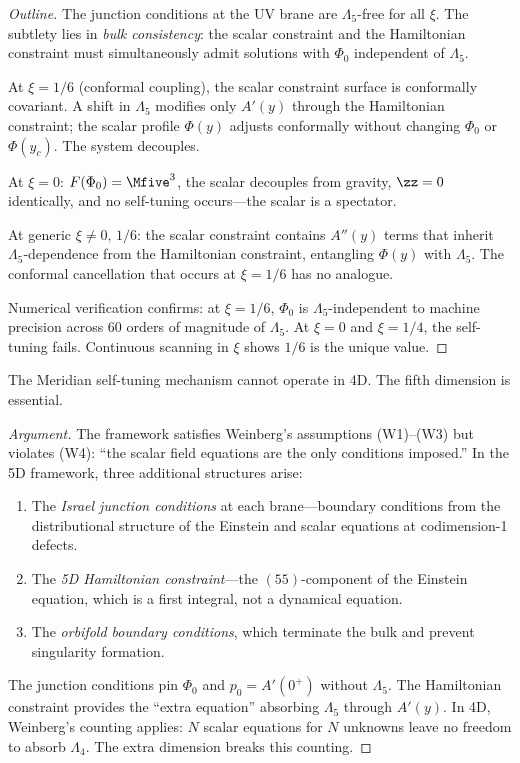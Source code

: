 \begin{proof}[Outline]
The junction conditions at the UV brane are $\Lambda_5$-free for all $\xi$. The subtlety lies in \emph{bulk consistency}: the scalar constraint and the Hamiltonian constraint must simultaneously admit solutions with $\Phi_0$ independent of $\Lambda_5$.

At $\xi = 1/6$ (conformal coupling), the scalar constraint surface is conformally covariant. A shift in $\Lambda_5$ modifies only $A'(y)$ through the Hamiltonian constraint; the scalar profile $\Phi(y)$ adjusts conformally without changing $\Phi_0$ or $\Phi(y_c)$. The system decouples.

At $\xi = 0$: $F(\Phi_0) = \Mfive^3$, the scalar decouples from gravity, $\zz = 0$ identically, and no self-tuning occurs---the scalar is a spectator.

At generic $\xi \neq 0,\,1/6$: the scalar constraint contains $A''(y)$ terms that inherit $\Lambda_5$-dependence from the Hamiltonian constraint, entangling $\Phi(y)$ with $\Lambda_5$. The conformal cancellation that occurs at $\xi = 1/6$ has no analogue.

Numerical verification confirms: at $\xi = 1/6$, $\Phi_0$ is $\Lambda_5$-independent to machine precision across 60 orders of magnitude of $\Lambda_5$. At $\xi = 0$ and $\xi = 1/4$, the self-tuning fails. Continuous scanning in $\xi$ shows $1/6$ is the unique value. \qedhere
\end{proof}

\begin{claim}
\label{thm:1-5D-necessity}
The Meridian self-tuning mechanism cannot operate in 4D. The fifth dimension is essential.
\end{claim}

\begin{proof}[Argument]
The framework satisfies Weinberg's assumptions (W1)--(W3) but violates (W4): ``the scalar field equations are the only conditions imposed.'' In the 5D framework, three additional structures arise:
\begin{enumerate}
\item The \emph{Israel junction conditions} at each brane---boundary conditions from the distributional structure of the Einstein and scalar equations at codimension-1 defects.
\item The \emph{5D Hamiltonian constraint}---the $(55)$-component of the Einstein equation, which is a first integral, not a dynamical equation.
\item The \emph{orbifold boundary conditions}, which terminate the bulk and prevent singularity formation.
\end{enumerate}
The junction conditions pin $\Phi_0$ and $p_0 = A'(0^+)$ without $\Lambda_5$. The Hamiltonian constraint provides the ``extra equation'' absorbing $\Lambda_5$ through $A'(y)$. In 4D, Weinberg's counting applies: $N$ scalar equations for $N$ unknowns leave no freedom to absorb $\Lambda_4$. The extra dimension breaks this counting. \qedhere
\end{proof}


